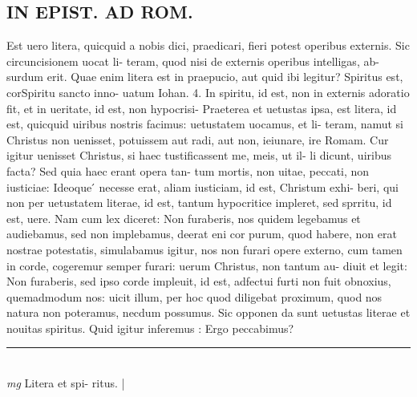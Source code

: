 \documentclass{article}
\begin{document}
\begin{pages}
\section*{IN EPIST. AD ROM.  }
\marginpar{[ p.70 ]}\pstart Est uero litera, quicquid a nobis dici, praedicari, fieri potest operibus externis. Sic circuncisionem uocat li- teram, quod nisi de externis operibus intelligas, ab- surdum erit. Quae enim litera est in praepucio, aut quid ibi legitur? Spiritus est, corSpiritu sancto inno- uatum Iohan. 4. In spiritu, id est, non in externis adoratio fit, et in ueritate, id est, non hypocrisi- Praeterea et uetustas ipsa, est litera, id est, quicquid uiribus nostris facimus: uetustatem uocamus, et li- teram, namut si Christus non uenisset, potuissem aut radi, aut non, ieiunare, ire Romam. Cur igitur uenisset Christus, si haec tustificassent me, meis, ut il- li dicunt, uiribus facta? Sed quia haec erant opera tan- tum mortis, non uitae, peccati, non iusticiae: Ideoque ́ necesse erat, aliam iusticiam, id est, Christum exhi- beri, qui non per uetustatem literae, id est, tantum hypocritice impleret, sed sprritu, id est, uere. Nam cum lex diceret: Non furaberis, nos quidem legebamus et audiebamus, sed non implebamus, deerat eni cor purum, quod habere, non erat nostrae potestatis, simulabamus igitur, nos non furari opere externo, cum tamen in corde, cogeremur semper furari: uerum Christus, non tantum au- diuit et legit: Non furaberis, sed ipso corde impleuit, id est, adfectui furti non fuit obnoxius, quemadmodum nos: uicit illum, per hoc quod diligebat proximum, quod nos natura non poteramus, necdum possumus. Sic opponen da sunt uetustas literae et nouitas spiritus. Quid igitur inferemus : Ergo peccabimus?  \pend
\vspace{0.5cm}\noindent
\vspace{0.2cm}\rule{1cm}{0.2pt}\\ 
\hspace{0.2cm}\textit{mg}
\footnotesize Litera et spi- ritus.  
\normalsize| 

\end{pages}
\end{document}
